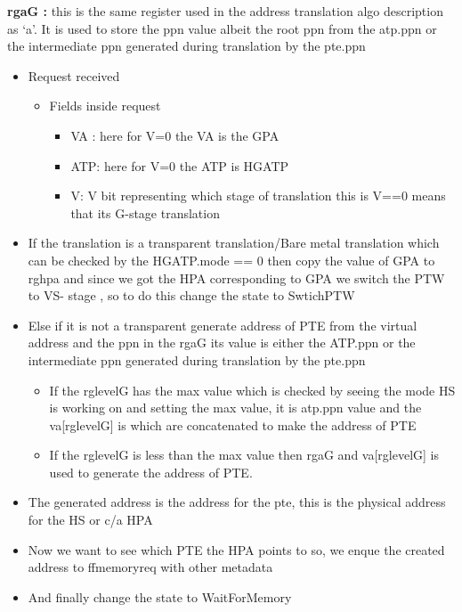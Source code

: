 \documentclass{article}
\begin{document}
\textbf{rg\textunderscore a\textunderscore G :}  this is the same register used in the address translation algo description as ‘a’. It is used to store the ppn value albeit the root ppn from the atp.ppn or the intermediate ppn generated during translation by the pte.ppn 

\begin{itemize}
\item Request received 
\begin{itemize}
\item Fields inside request
\begin{itemize}

\item VA : here for V=0 the VA is the GPA
\item ATP: here for V=0 the ATP is HGATP
\item V: V bit representing which stage of translation this is  V==0 means that its G-stage translation 
\end{itemize}

\end{itemize}


\item If the translation is a transparent translation/Bare metal translation which can be checked by the HGATP.mode == 0 then copy the value of GPA to rg\textunderscore hpa and since we got the HPA corresponding to GPA we switch the PTW to VS- stage , so to do this change the state to SwtichPTW  
\item Else if it is not a transparent generate address of PTE from the virtual address and the ppn in the  rg\textunderscore a\textunderscore G its value is either the ATP.ppn or the  intermediate ppn generated during translation by the pte.ppn
\begin{itemize}
\item If the rg\textunderscore level\textunderscore G has the max value which is checked by seeing the mode HS is working on and setting the max value, it is atp.ppn value and the va[rg\textunderscore level\textunderscore G] is which are concatenated to make the address of PTE
\item If the rg\textunderscore level\textunderscore G  is less than the max value then rg\textunderscore a\textunderscore G and va[rg\textunderscore level\textunderscore G] is used to generate the address of PTE.
\end{itemize} 

\item The generated address is the address for the pte, this is the physical address for the HS or c/a HPA 
\item Now we want to see which PTE the HPA points to so, we enque the created address to ff\textunderscore memory\textunderscore req with other metadata
\item And finally change the state to WaitForMemory
\end{itemize}
\end{document}
